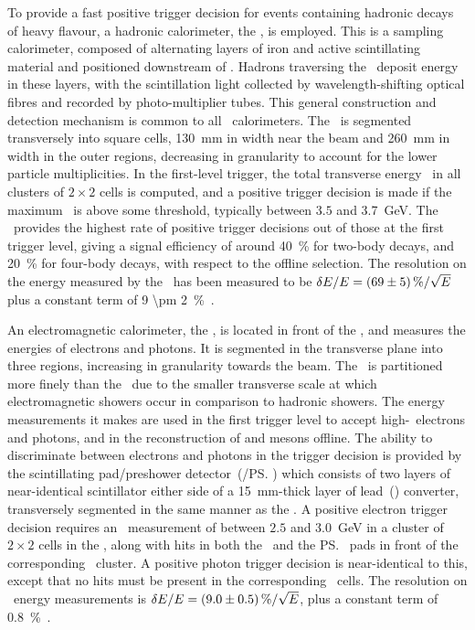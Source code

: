 To provide a fast positive trigger decision for events containing hadronic 
decays of heavy flavour, a hadronic calorimeter, the \hcal, is employed.
This is a sampling calorimeter, composed of alternating layers of iron and 
active scintillating material and positioned downstream of \richtwo.
Hadrons traversing the \hcal\ deposit energy in these layers, with the 
scintillation light collected by wavelength-shifting optical fibres and 
recorded by photo-multiplier tubes.
This general construction and detection mechanism is common to all \lhcb\ 
calorimeters.
The \hcal\ is segmented transversely into square cells, \SI{130}{\milli\metre} 
in width near the beam and \SI{260}{\milli\metre} in width in the outer 
regions, decreasing in granularity to account for the lower particle 
multiplicities.
In the first-level trigger, the total transverse energy \ET\ in all clusters of 
$2\times2$ cells is computed, and a positive trigger decision is made if the 
maximum \ET\ is above some threshold, typically between $3.5$ and 
\SI{3.7}{\GeV}.
The \hcal\ provides the highest rate of positive trigger decisions out of those 
at the first trigger level, giving a signal efficiency of around 
\SI{40}{\percent} for two-body \PB decays, and \SI{20}{\percent} for four-body 
\PD decays, with respect to the offline selection.
The resolution on the energy measured by the \hcal\ has been measured to be 
$\unc{E}/E = \SI{69 \pm 5}{\percent}/\sqrt{E}$ plus a constant term of \SI{9 
  \pm 2}{\percent}~\cite{Perret:2015pla}.

An electromagnetic calorimeter, the \ecal, is located in front of the \hcal, 
and measures the energies of electrons and photons.
It is segmented in the transverse plane into three regions, increasing in 
granularity towards the beam.
The \ecal\ is partitioned more finely than the \hcal\ due to the smaller 
transverse scale at which electromagnetic showers occur in comparison to 
hadronic showers.
The energy measurements it makes are used in the first trigger level to accept 
high-\ET\ electrons and photons, and in the reconstruction of \Ppizero and 
\Peta mesons offline.
The ability to discriminate between electrons and photons in the trigger 
decision is provided by the scintillating pad/preshower detector~(\spd/\ps) 
which consists of two layers of near-identical scintillator either side of a 
\SI{15}{\milli\metre}-thick layer of lead~(\ce{Pb}) converter, transversely 
segmented in the same manner as the \ecal.
A positive electron trigger decision requires an \ET\ measurement of between 
$2.5$ and \SI{3.0}{\GeV} in a cluster of $2\times2$ cells in the \ecal, along 
with hits in both the \spd\ and the \ps\ pads in front of the corresponding 
\ecal\ cluster.  A positive photon trigger decision is near-identical to this, 
except that no hits must be present in the corresponding \spd\ cells.
The resolution on \ecal\ energy measurements is $\unc{E}/E = \SI{9 \pm 
  0.5}{\percent}/\sqrt{E}$, plus a constant term of 
\SI{0.8}{\percent}~\cite{Perret:2015pla}.

